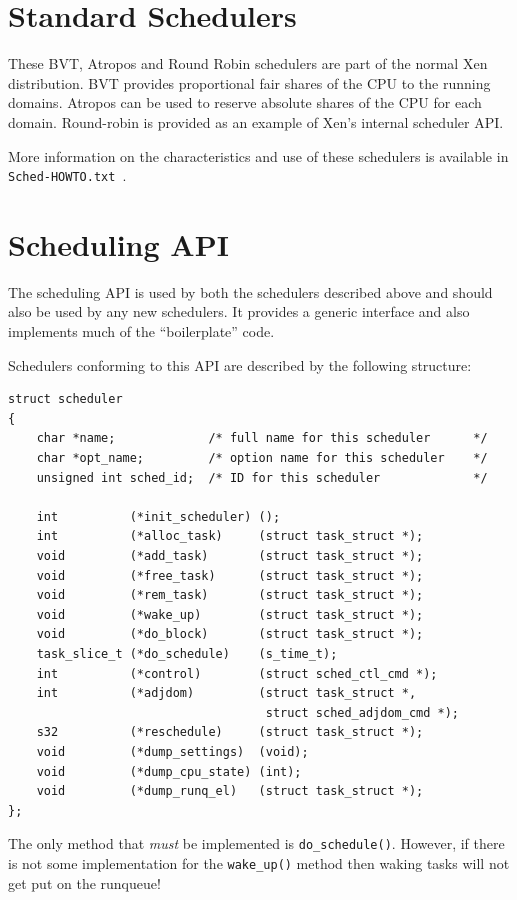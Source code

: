 \documentclass[11pt,twoside,final,openright]{xenstyle}
\begin{document}
\section{Standard Schedulers}

These BVT, Atropos and Round Robin schedulers are part of the normal
Xen distribution.  BVT provides proportional fair shares of the CPU to
the running domains.  Atropos can be used to reserve absolute shares
of the CPU for each domain.  Round-robin is provided as an example of
Xen's internal scheduler API.

More information on the characteristics and use of these schedulers is
available in { \tt Sched-HOWTO.txt }.

\section{Scheduling API}

The scheduling API is used by both the schedulers described above and should
also be used by any new schedulers.  It provides a generic interface and also
implements much of the ``boilerplate'' code.

Schedulers conforming to this API are described by the following
structure:

\begin{verbatim}
struct scheduler
{
    char *name;             /* full name for this scheduler      */
    char *opt_name;         /* option name for this scheduler    */
    unsigned int sched_id;  /* ID for this scheduler             */

    int          (*init_scheduler) ();
    int          (*alloc_task)     (struct task_struct *);
    void         (*add_task)       (struct task_struct *);
    void         (*free_task)      (struct task_struct *);
    void         (*rem_task)       (struct task_struct *);
    void         (*wake_up)        (struct task_struct *);
    void         (*do_block)       (struct task_struct *);
    task_slice_t (*do_schedule)    (s_time_t);
    int          (*control)        (struct sched_ctl_cmd *);
    int          (*adjdom)         (struct task_struct *,
                                    struct sched_adjdom_cmd *);
    s32          (*reschedule)     (struct task_struct *);
    void         (*dump_settings)  (void);
    void         (*dump_cpu_state) (int);
    void         (*dump_runq_el)   (struct task_struct *);
};
\end{verbatim}

The only method that {\em must} be implemented is
{\tt do\_schedule()}.  However, if there is not some implementation for the
{\tt wake\_up()} method then waking tasks will not get put on the runqueue!
\end{document}
